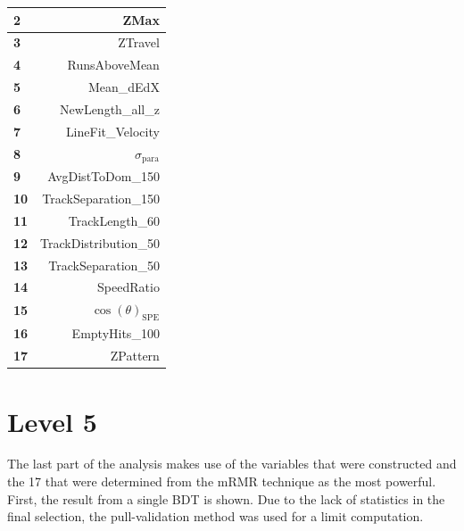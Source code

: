 \begin{table}[]
\begin{tabular}{|l|r|}
\textbf{2} & ZMax \\ \hline
\textbf{3} & ZTravel \\ \hline
\textbf{4} & RunsAboveMean \\ \hline
\textbf{5} & Mean\_dEdX \\ \hline
\textbf{6} & NewLength\_all\_z \\ \hline
\textbf{7} & LineFit\_Velocity \\ \hline
\textbf{8} & $\sigma_\textrm{para}$ \\ \hline
\textbf{9} & AvgDistToDom\_150 \\ \hline
\textbf{10} & TrackSeparation\_150 \\ \hline
\textbf{11} & TrackLength\_60 \\ \hline
\textbf{12} & TrackDistribution\_50 \\ \hline
\textbf{13} & TrackSeparation\_50 \\ \hline
\textbf{14} & SpeedRatio \\ \hline
\textbf{15} & $\cos(\theta)_\textrm{SPE}$ \\ \hline
\textbf{16} & EmptyHits\_100 \\ \hline
\textbf{17} & ZPattern \\ \hline
\end{tabular}
\end{table}

\section{Level 5}
The last part of the analysis makes use of the variables that were constructed and the 17 that were determined from the mRMR technique as the most powerful. First, the result from a single BDT is shown. Due to the lack of statistics in the final selection, the pull-validation method was used for a limit computation.

